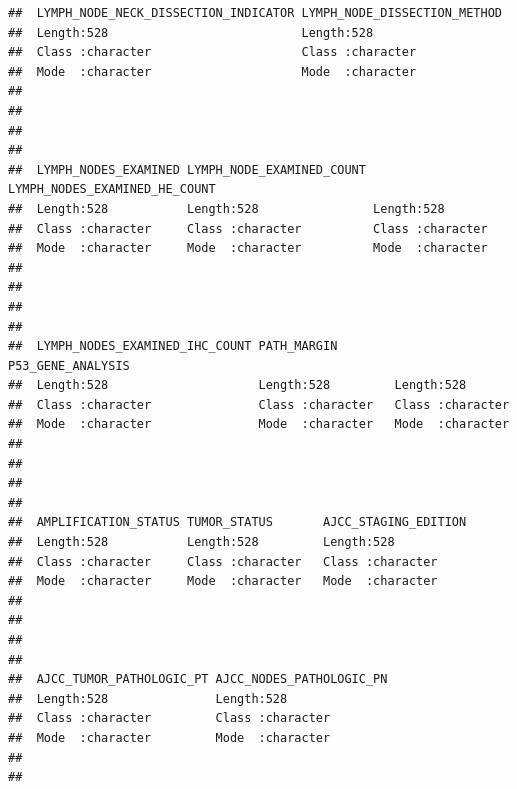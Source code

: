 \documentclass[
  11pt,
]{article}
\begin{document}
\begin{verbatim}
##  LYMPH_NODE_NECK_DISSECTION_INDICATOR LYMPH_NODE_DISSECTION_METHOD
##  Length:528                           Length:528                  
##  Class :character                     Class :character            
##  Mode  :character                     Mode  :character            
##                                                                   
##                                                                   
##                                                                   
##                                                                   
##  LYMPH_NODES_EXAMINED LYMPH_NODE_EXAMINED_COUNT LYMPH_NODES_EXAMINED_HE_COUNT
##  Length:528           Length:528                Length:528                   
##  Class :character     Class :character          Class :character             
##  Mode  :character     Mode  :character          Mode  :character             
##                                                                              
##                                                                              
##                                                                              
##                                                                              
##  LYMPH_NODES_EXAMINED_IHC_COUNT PATH_MARGIN        P53_GENE_ANALYSIS 
##  Length:528                     Length:528         Length:528        
##  Class :character               Class :character   Class :character  
##  Mode  :character               Mode  :character   Mode  :character  
##                                                                      
##                                                                      
##                                                                      
##                                                                      
##  AMPLIFICATION_STATUS TUMOR_STATUS       AJCC_STAGING_EDITION
##  Length:528           Length:528         Length:528          
##  Class :character     Class :character   Class :character    
##  Mode  :character     Mode  :character   Mode  :character    
##                                                              
##                                                              
##                                                              
##                                                              
##  AJCC_TUMOR_PATHOLOGIC_PT AJCC_NODES_PATHOLOGIC_PN
##  Length:528               Length:528              
##  Class :character         Class :character        
##  Mode  :character         Mode  :character        
##                                                   
##                                                   

\end{verbatim}
\end{document}
